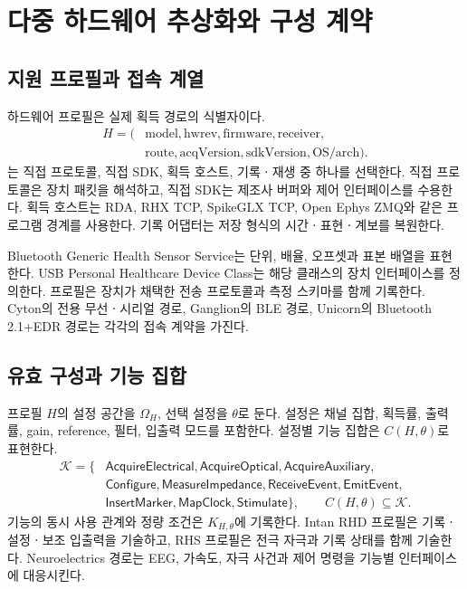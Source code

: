 \section{다중 하드웨어 추상화와 구성 계약}
\label{sec:hardware}
\subsection{지원 프로필과 접속 계열}
하드웨어 프로필은 실제 획득 경로의 식별자이다.
\begin{equation}
 \begin{aligned}
 H=(&\mathrm{model},\mathrm{hwrev},\mathrm{firmware},\mathrm{receiver},\\
    &\mathrm{route},\mathrm{acqVersion},\mathrm{sdkVersion},\mathrm{OS/arch}).
 \end{aligned}
 \label{eq:hardwareprofile}
\end{equation}
는 직접 프로토콜, 직접 SDK, 획득 호스트, 기록ㆍ재생 중 하나를 선택한다.
직접 프로토콜은 장치 패킷을 해석하고, 직접 SDK는 제조사 버퍼와 제어 인터페이스를 수용한다.
획득 호스트는 RDA, RHX TCP, SpikeGLX TCP, Open Ephys ZMQ와 같은 프로그램 경계를 사용한다.
기록 어댑터는 저장 형식의 시간ㆍ표현ㆍ계보를 복원한다\cite{recorder,intan_rhx,spikeglx,open_ephys_zmq}.

Bluetooth Generic Health Sensor Service는 단위, 배율, 오프셋과 표본 배열을 표현한다.
USB Personal Healthcare Device Class는 해당 클래스의 장치 인터페이스를 정의한다\cite{ghss,usb_classes}.
프로필은 장치가 채택한 전송 프로토콜과 측정 스키마를 함께 기록한다.
Cyton의 전용 무선ㆍ시리얼 경로, Ganglion의 BLE 경로, Unicorn의 Bluetooth 2.1+EDR 경로는
각각의 접속 계약을 가진다\cite{cyton,ganglion,unicorn_manual}.

\subsection{유효 구성과 기능 집합}
프로필 $H$의 설정 공간을 $\Omega_H$, 선택 설정을 $\theta$로 둔다.
설정은 채널 집합, 획득률, 출력률, gain, reference, 필터, 입출력 모드를 포함한다.
설정별 기능 집합은 $C(H,\theta)$로 표현한다.
\begin{equation}
 \begin{aligned}
 \mathcal K=\{&\mathsf{AcquireElectrical},\mathsf{AcquireOptical},
               \mathsf{AcquireAuxiliary},\\
             &\mathsf{Configure},\mathsf{MeasureImpedance},
               \mathsf{ReceiveEvent},\mathsf{EmitEvent},\\
             &\mathsf{InsertMarker},\mathsf{MapClock},\mathsf{Stimulate}\},
 \qquad C(H,\theta)\subseteq\mathcal K.
 \end{aligned}
\end{equation}
기능의 동시 사용 관계와 정량 조건은 $K_{H,\theta}$에 기록한다.
Intan RHD 프로필은 기록ㆍ설정ㆍ보조 입출력을 기술하고, RHS 프로필은 전극 자극과
기록 상태를 함께 기술한다\cite{intan_rhd,intan_rhs}.
Neuroelectrics 경로는 EEG, 가속도, 자극 사건과 제어 명령을 기능별 인터페이스에 대응시킨다\cite{neuroelectrics}.

